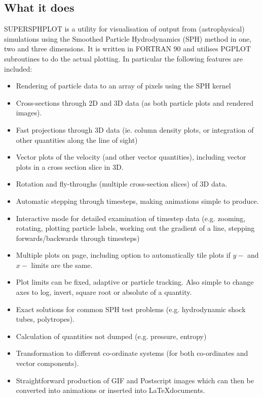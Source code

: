 \documentclass[a4paper,12pt]{article}
\begin{document}
\subsection{What it does}
SUPERSPHPLOT is a utility for visualisation of output from (astrophysical) simulations using the
Smoothed Particle Hydrodynamics (SPH) method in one, two and three dimensions.
It is written in FORTRAN 90 and
utilises PGPLOT subroutines to do the actual plotting. In particular the following
features are included:
\begin{itemize}
\item Rendering of particle data to an array of pixels using the SPH kernel
\item Cross-sections through 2D and 3D data (as both particle plots and rendered
images).
\item Fast projections through 3D data (ie. column density plots, or integration of
other quantities along the line of sight)
\item Vector plots of the velocity (and other vector quantities), including vector
plots in a cross section slice in 3D.
\item Rotation and fly-throughs (multiple cross-section slices) of 3D data.
\item Automatic stepping through timesteps, making animations simple to produce.
\item Interactive mode for detailed examination of timestep data (e.g. zooming,
rotating, plotting particle labels, working out the gradient of a line, stepping forwards/backwards
through timesteps)
\item Multiple plots on page, including option to automatically tile plots if $y-$ and $x-$ limits
are the same.
\item Plot limits can be fixed, adaptive or particle tracking. Also simple to change
axes to log, invert, square root or absolute of a quantity.
\item Exact solutions for common SPH test problems (e.g. hydrodynamic shock tubes,
polytropes).
\item Calculation of quantities not dumped (e.g. pressure, entropy)
\item Transformation to different co-ordinate systems (for both co-ordinates and
vector components).
\item Straightforward production of GIF and Postscript images which can then be
converted into animations or inserted into \LaTeX documents.
\end{itemize}
\end{document}
